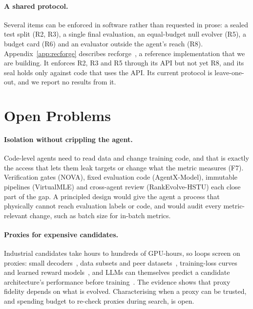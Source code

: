 \documentclass[sigconf,nonacm]{acmart}
\begin{document}
\paragraph{A shared protocol.} Several items can be enforced in software rather than requested in prose: a sealed
test split (R2, R3), a single final evaluation, an equal-budget null evolver (R5), a budget card (R6) and an
evaluator outside the agent's reach (R8). Appendix~\ref{app:recforge} describes recforge~\cite{recforge}, a
reference implementation that we are building. It enforces R2, R3 and R5 through its API but not yet R8, and its seal holds
only against code that uses the API. Its current protocol is leave-one-out, and we report no results from it.

\section{Open Problems}\label{sec:open}

\paragraph{Isolation without crippling the agent.} Code-level agents need to read data and change training code, and
that is exactly the access that lets them leak targets or change what the metric measures (F7). Verification gates
(NOVA), fixed evaluation code (AgentX-Model), immutable pipelines (VirtualMLE) and cross-agent review (RankEvolve-HSTU) each
close part of the gap. A principled design would give the agent a process that physically cannot reach evaluation
labels or code, and would audit every metric-relevant change, such as batch size for in-batch metrics.

\paragraph{Proxies for expensive candidates.} Industrial candidates take hours to hundreds of GPU-hours, so loops screen
on proxies: small decoders~\cite{nian2026semanticindex}, data subsets and peer datasets~\cite{peng2026population},
training-loss curves and learned reward models~\cite{hu2026astar}, and LLMs can themselves predict a candidate
architecture's performance before training~\cite{jawahar2024llmpp}. The evidence shows that proxy fidelity depends on
what is evolved. Characterising when a proxy can be trusted, and spending budget to re-check proxies during search, is
open.
\end{document}
